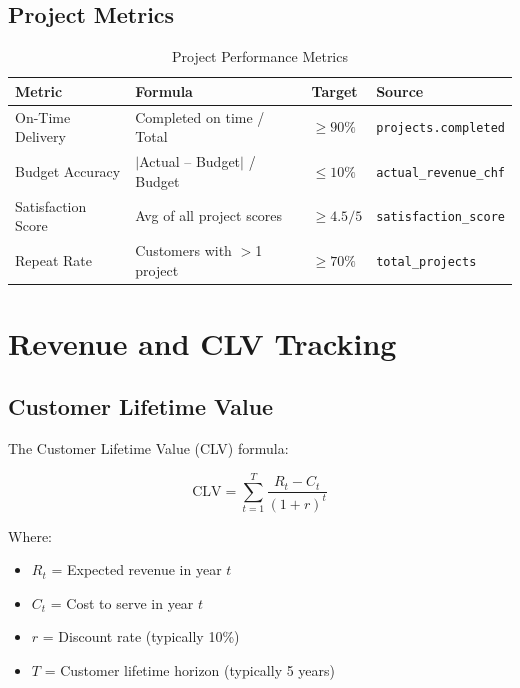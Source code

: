 \subsection{Project Metrics}

\begin{table}[htbp]
\centering
\caption{Project Performance Metrics}
\label{tab:bp-project-metrics}
\renewcommand{\arraystretch}{1.3}
\begin{tabular}{@{}llll@{}}
\toprule
\textbf{Metric} & \textbf{Formula} & \textbf{Target} & \textbf{Source} \\
\midrule
On-Time Delivery & Completed on time / Total & $\geq 90\%$ & \texttt{projects.completed} \\
Budget Accuracy & $|$Actual -- Budget$|$ / Budget & $\leq 10\%$ & \texttt{actual\_revenue\_chf} \\
Satisfaction Score & Avg of all project scores & $\geq 4.5/5$ & \texttt{satisfaction\_score} \\
Repeat Rate & Customers with $>$1 project & $\geq 70\%$ & \texttt{total\_projects} \\
\bottomrule
\end{tabular}
\end{table}


\section{Revenue and CLV Tracking}
\label{sec:bp-revenue}

\subsection{Customer Lifetime Value}

The Customer Lifetime Value (CLV) formula:

\begin{equation}
\text{CLV} = \sum_{t=1}^{T} \frac{R_t - C_t}{(1+r)^t}
\end{equation}

Where:
\begin{itemize}[nosep]
\item $R_t$ = Expected revenue in year $t$
\item $C_t$ = Cost to serve in year $t$
\item $r$ = Discount rate (typically 10\%)
\item $T$ = Customer lifetime horizon (typically 5 years)
\end{itemize}

